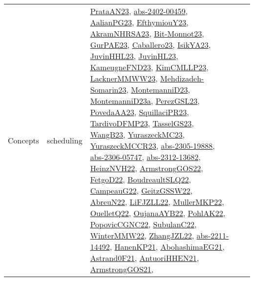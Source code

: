 {\begin{longtable}{lp{3cm}>{\raggedright}p{6cm}>{\raggedright}p{6cm}p{8cm}}
Concepts & scheduling & \href{articles/PrataAN23.pdf}{PrataAN23}\cite{PrataAN23}, \href{articles/abs-2402-00459.pdf}{abs-2402-00459}\cite{abs-2402-00459}, \href{papers/AalianPG23.pdf}{AalianPG23}\cite{AalianPG23}, \href{papers/EfthymiouY23.pdf}{EfthymiouY23}\cite{EfthymiouY23}, \href{articles/AkramNHRSA23.pdf}{AkramNHRSA23}\cite{AkramNHRSA23}, \href{papers/Bit-Monnot23.pdf}{Bit-Monnot23}\cite{Bit-Monnot23}, \href{articles/GurPAE23.pdf}{GurPAE23}\cite{GurPAE23}, \href{articles/Caballero23.pdf}{Caballero23}\cite{Caballero23}, \href{articles/IsikYA23.pdf}{IsikYA23}\cite{IsikYA23}, \href{papers/JuvinHHL23.pdf}{JuvinHHL23}\cite{JuvinHHL23}, \href{papers/JuvinHL23.pdf}{JuvinHL23}\cite{JuvinHL23}, \href{papers/KameugneFND23.pdf}{KameugneFND23}\cite{KameugneFND23}, \href{papers/KimCMLLP23.pdf}{KimCMLLP23}\cite{KimCMLLP23}, \href{articles/LacknerMMWW23.pdf}{LacknerMMWW23}\cite{LacknerMMWW23}, \href{papers/Mehdizadeh-Somarin23.pdf}{Mehdizadeh-Somarin23}\cite{Mehdizadeh-Somarin23}, \href{articles/MontemanniD23.pdf}{MontemanniD23}\cite{MontemanniD23}, \href{articles/MontemanniD23a.pdf}{MontemanniD23a}\cite{MontemanniD23a}, \href{papers/PerezGSL23.pdf}{PerezGSL23}\cite{PerezGSL23}, \href{papers/PovedaAA23.pdf}{PovedaAA23}\cite{PovedaAA23}, \href{papers/SquillaciPR23.pdf}{SquillaciPR23}\cite{SquillaciPR23}, \href{papers/TardivoDFMP23.pdf}{TardivoDFMP23}\cite{TardivoDFMP23}, \href{papers/TasselGS23.pdf}{TasselGS23}\cite{TasselGS23}, \href{papers/WangB23.pdf}{WangB23}\cite{WangB23}, \href{papers/YuraszeckMC23.pdf}{YuraszeckMC23}\cite{YuraszeckMC23}, \href{articles/YuraszeckMCCR23.pdf}{YuraszeckMCCR23}\cite{YuraszeckMCCR23}, \href{articles/abs-2305-19888.pdf}{abs-2305-19888}\cite{abs-2305-19888}, \href{articles/abs-2306-05747.pdf}{abs-2306-05747}\cite{abs-2306-05747}, \href{articles/abs-2312-13682.pdf}{abs-2312-13682}\cite{abs-2312-13682}, \href{articles/HeinzNVH22.pdf}{HeinzNVH22}\cite{HeinzNVH22}, \href{papers/ArmstrongGOS22.pdf}{ArmstrongGOS22}\cite{ArmstrongGOS22}, \href{articles/FetgoD22.pdf}{FetgoD22}\cite{FetgoD22}, \href{papers/BoudreaultSLQ22.pdf}{BoudreaultSLQ22}\cite{BoudreaultSLQ22}, \href{articles/CampeauG22.pdf}{CampeauG22}\cite{CampeauG22}, \href{papers/GeitzGSSW22.pdf}{GeitzGSSW22}\cite{GeitzGSSW22}, \href{articles/AbreuN22.pdf}{AbreuN22}\cite{AbreuN22}, \href{papers/LiFJZLL22.pdf}{LiFJZLL22}\cite{LiFJZLL22}, \href{articles/MullerMKP22.pdf}{MullerMKP22}\cite{MullerMKP22}, \href{papers/OuelletQ22.pdf}{OuelletQ22}\cite{OuelletQ22}, \href{papers/OujanaAYB22.pdf}{OujanaAYB22}\cite{OujanaAYB22}, \href{articles/PohlAK22.pdf}{PohlAK22}\cite{PohlAK22}, \href{papers/PopovicCGNC22.pdf}{PopovicCGNC22}\cite{PopovicCGNC22}, \href{articles/SubulanC22.pdf}{SubulanC22}\cite{SubulanC22}, \href{papers/WinterMMW22.pdf}{WinterMMW22}\cite{WinterMMW22}, \href{papers/ZhangJZL22.pdf}{ZhangJZL22}\cite{ZhangJZL22}, \href{articles/abs-2211-14492.pdf}{abs-2211-14492}\cite{abs-2211-14492}, \href{papers/HanenKP21.pdf}{HanenKP21}\cite{HanenKP21}, \href{articles/AbohashimaEG21.pdf}{AbohashimaEG21}\cite{AbohashimaEG21}, \href{papers/Astrand0F21.pdf}{Astrand0F21}\cite{Astrand0F21}, \href{papers/AntuoriHHEN21.pdf}{AntuoriHHEN21}\cite{AntuoriHHEN21}, \href{papers/ArmstrongGOS21.pdf}{ArmstrongGOS21}\cite{ArmstrongGOS21}, 
\end{longtable}}
